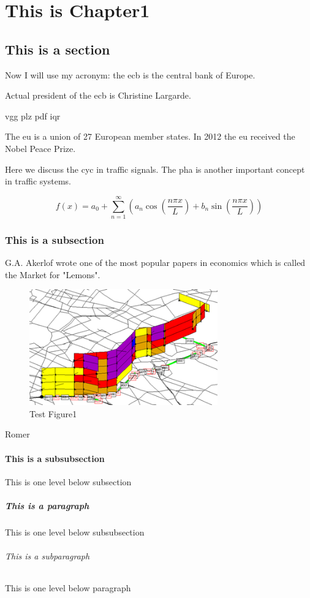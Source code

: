 \chapter{This is Chapter1}

\lipsum[1]%

\section{This is a section}
Now I will use my acronym: the \gls{ecb} is the central bank of Europe. 

Actual president of the \gls{ecb} is Christine Largarde.

\gls{vgg} \gls{plz} \gls{pdf} \gls{iqr}

The \gls{eu} is a union of 27 European member states. In 2012 the \gls{eu} received the Nobel Peace Prize.

Here we discuss the \gls{cyc} in traffic signals. The \gls{pha} is another important concept in traffic systems.

\begin{equation}
    f(x) = a_0 + \sum_{n=1}^{\infty} \left( a_n \cos\left(\frac{n\pi x}{L}\right) + b_n \sin\left(\frac{n\pi x}{L}\right) \right) \label{eq:fourier} 
\end{equation}

\subsection{This is a subsection}
G.A. Akerlof wrote one of the most popular papers in economics which is called the Market for "Lemons"\parencite{akerlof1970}.
\begin{figure}[H] %
    \centering
    \includegraphics[height=50mm]{Images/TestPic.png} %
    \caption{Test Figure1} %
    \label{fig:TestFigure1} %
\end{figure} 

Romer \parencite{romer1990endogenous}

\subsubsection{This is a subsubsection}
This is one level below subsection

\paragraph{This is a paragraph}
This is one level below subsubsection


\subparagraph{This is a subparagraph}
This is one level below paragraph